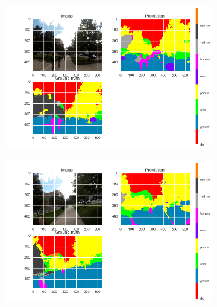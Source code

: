 \begin{figure}[p]
    \captionsetup[subfigure]{justification=centering}
    \begin{minipage}[c]{.95\textwidth}
        \begin{subfigure}{.47\textwidth}
            \centering
            \includegraphics[trim={13 10mm 25mm 10mm},clip,width=\linewidth]{img/deconvLSTM/gatech_10_204-0.png}
            \caption{}\label{fig:deconvlstm_gatech_samples:a}
        \end{subfigure}%
        \begin{subfigure}{.47\textwidth}
            \centering
            \includegraphics[trim={13 10mm 25mm 10mm},clip,width=\linewidth]{img/deconvLSTM/gatech_10_339-2.png}
            \caption{}\label{fig:deconvlstm_gatech_samples:b}
        \end{subfigure}
        \begin{subfigure}{.47\textwidth}

\end{subfigure}
\end{minipage}
\end{figure}
